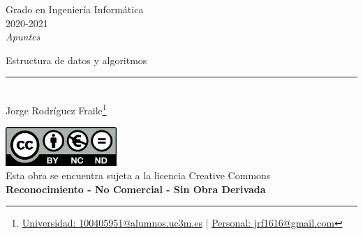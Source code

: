 \documentclass[12pt, twoside, openright]{report} %
\begin{document}
	
\begin{titlepage}
	\begin{sffamily}
	\color{azulUC3M}
	\begin{center}
		\begin{figure}[H] %
		\end{figure}
		\vspace{2.5cm}
		\begin{Large}
			Grado en Ingeniería Informática\\			
			2020-2021\\
			\vspace{2cm}		
			\textsl{Apuntes}\\
			\bigskip
		\end{Large}
		 	{\Huge Estructura de datos y algoritmos}\\
		 	\vspace*{0.5cm}
	 		\rule{10.5cm}{0.1mm}\\
			\vspace*{0.9cm}
			{\LARGE Jorge Rodríguez Fraile\footnote{\href{mailto:100405951@alumnos.uc3m.es}{Universidad: 100405951@alumnos.uc3m.es}  |  \href{mailto:jrf1616@gmail.com}{Personal: jrf1616@gmail.com}}}\\ 
			\vspace*{1cm}
	\end{center}
	\vfill
	\color{black}
		\includegraphics[width=4.2cm]{img/creativecommons.png}\\
		Esta obra se encuentra sujeta a la licencia Creative Commons\\ \textbf{Reconocimiento - No Comercial - Sin Obra Derivada}
	\end{sffamily}
\end{titlepage}


\tableofcontents
\thispagestyle{fancy}
\end{document}
